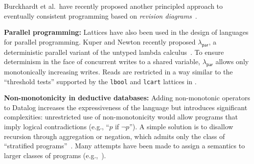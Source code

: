 Burckhardt et al.\ have recently proposed another principled approach to
eventually consistent programming based on \emph{revision
  diagrams}~\cite{Burckhardt2012a,Burckhardt2012b}. 





\vspace{0.5em}\noindent
\textbf{Parallel programming:} Lattices have also been used in the design of
languages for parallel programming. Kuper and Newton recently proposed
$\lambda_{\textsf{par}}$, a deterministic parallel variant of the untyped lambda
calculus~\cite{Kuper2012}. To ensure determinism in the face of concurrent
writes to a shared variable, $\lambda_{\textsf{par}}$ allows only monotonically
increasing writes. Reads are restricted in a way similar to the ``threshold
tests'' supported by the \texttt{lbool} and \texttt{lcart} lattices in \lang.

\vspace{0.5em}\noindent
\textbf{Non-monotonicity in deductive databases:} Adding non-monotonic operators
to Datalog increases the expressiveness of the language but introduces
significant complexities: unrestricted use of non-monotonicity would allow
programs that imply logical contradictions (e.g., ``$p$ if $\lnot p$''). A
simple solution is to disallow recursion through aggregation or negation, which
admits only the class of ``stratified programs''~\cite{Apt1988}. Many attempts
have been made to assign a semantics to larger classes of programs
(e.g.,~\cite{Gelfond1988,Ross1990,VanGelder1991}).

